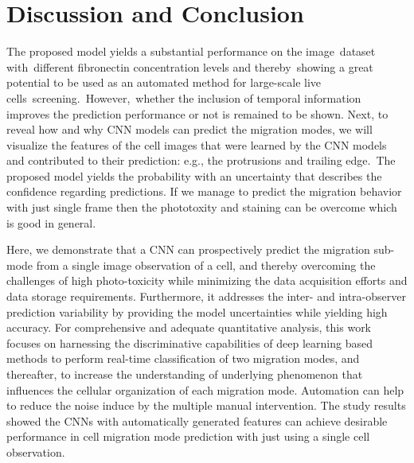\documentclass{article}
\begin{document}
\section{Discussion and Conclusion}
\label{sec:concl}

The proposed model yields a substantial performance on the image dataset with different fibronectin 
concentration levels and thereby showing a great potential to be used as an automated method for 
large-scale live cells screening. However, whether the inclusion of temporal information improves the 
prediction performance or not is remained to be shown. Next, to reveal how and why CNN models can predict 
the migration modes, we will visualize the features of the cell images that were learned by the CNN 
models and contributed to their prediction: e.g., the protrusions and trailing edge. The proposed model 
yields the probability with an uncertainty that describes the confidence regarding predictions. 
If we manage to predict  the migration behavior with just single frame then the phototoxity and staining 
can be overcome which is good in general.


Here, we demonstrate that a CNN can prospectively predict the migration sub-mode from a single 
image observation of a cell, and thereby overcoming the challenges of high photo-toxicity while 
minimizing the data acquisition efforts and data storage requirements. Furthermore, it addresses the 
inter- and intra-observer prediction variability by providing the model uncertainties while yielding 
high accuracy. For comprehensive and adequate quantitative analysis, this work focuses on harnessing 
the discriminative capabilities of deep learning based methods to perform real-time classification of 
two migration modes, and thereafter, to increase the understanding of underlying phenomenon that 
influences the cellular organization of each migration mode. Automation can help to reduce the noise 
induce by the multiple manual intervention. 
The study results showed the CNNs with automatically generated features can achieve desirable performance 
in cell migration mode prediction with just using a single cell observation.
\end{document}
